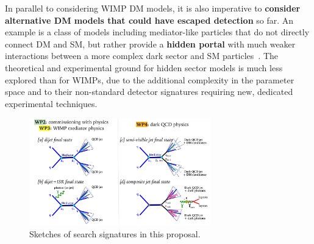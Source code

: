 
In parallel to considering WIMP DM models, it is also imperative to \textbf{consider alternative DM models that could have escaped detection} so far. 
An example is a class of models including mediator-like particles that do not directly connect DM and SM, but rather provide a \textbf{hidden portal} with much weaker interactions between a more complex dark sector and SM particles~\cite{Strassler:2006im}. 
The theoretical and experimental ground for hidden sector models is much less explored than for WIMPs, 
due to the additional complexity in the parameter space and to their non-standard detector signatures requiring new, dedicated experimental techniques. 

\begin{figure} 
\begin{center}
\includegraphics[width=0.7\textwidth]{figs_B2/feynman.pdf}
\caption{Sketches of search signatures in this proposal.\color{black}\label{fig:feynman} }
\vskip2pt
\end{center}
\end{figure}

